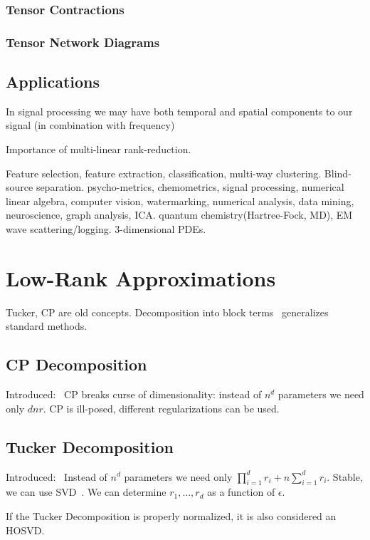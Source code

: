 \documentclass[10pt]{article}
\begin{document}
\subsubsection{Tensor Contractions}
\subsubsection{Tensor Network Diagrams}
\subsection{Applications}
In signal processing we may have both temporal and spatial components to our signal (in combination with frequency)

Importance of multi-linear rank-reduction.

Feature selection, feature extraction, classification, multi-way clustering.
Blind-source separation. 
psycho-metrics, chemometrics, signal processing, numerical linear algebra, computer vision, watermarking, numerical analysis, data mining, neuroscience, graph analysis, ICA.
quantum chemistry(Hartree-Fock, MD), EM wave scattering/logging. 3-dimensional PDEs. 
\section{Low-Rank Approximations}

Tucker, CP are old concepts. Decomposition into block terms~\cite{Lathauwer08decompositionsof} generalizes standard methods.

\subsection{CP Decomposition}
Introduced:~\cite{hitchcock-sum-1927}
CP breaks curse of dimensionality: instead of $n^d$ parameters we need only $dnr$.
CP is ill-posed, different regularizations can be used.
\subsection{Tucker Decomposition}
Introduced:~\cite{Tuck1966c}
Instead of $n^d$ parameters we need only $\prod_{i=1}^d r_i + n\sum_{i=1}^d r_i$.
Stable, we can use SVD~\cite{Lathauwer00amultilinear}.
We can determine $r_1, \dots, r_d$ as a function of $\epsilon$.

If the Tucker Decomposition is properly normalized, it is also considered an HOSVD.
\end{document}
